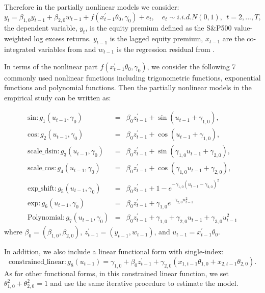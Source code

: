 \documentclass[a4paper,12pt,times,numbered,print,index]{report}
\numberwithin{equation}{section}
\begin{document}
	Therefore in the partially nonlinear models we consider: 
	$$
	y_{t} = \beta_{1,0} y_{t-1} + \beta_{2,0} w_{t-1} + f\left( x_{t-1}^{\prime }\theta _{0},\gamma _{0}\right) +e_{t}, \quad
	e_{t}\sim i.i.d.N\left( 0,1\right) ,\ \ t=2,...,T,
	$$
	the dependent variable, $y_t$, is the equity premium defined as the S\&P500 value-weighted log excess returns. $y_{t-1}$ is the lagged equity premium, $x_{t-1}$ are the co-integrated variables from \cite{zhou2018semiparametric} and $w_{t-1}$ is the regression residual from \cite{lettau2001consumption}. 
	
	In terms of the nonlinear part $f\left( x_{t-1}^{\prime }\theta _{0},\gamma _{0}\right)$, we consider the following 7 commonly used nonlinear functions including trigonometric functions, exponential functions and polynomial functions. Then the partially nonlinear models in the empirical study can be written as:
	
	\begin{eqnarray*}
		\text{sin}: g_{1}\left( u_{t-1},\gamma _{0}\right) &=& \beta _{0} z_{t-1}^{\prime} + \sin \left( u_{t-1}+\gamma_{1,0}\right),  \\
		\text{cos}: g_{2}\left( u_{t-1},\gamma _{0}\right) &=& \beta _{0} z_{t-1}^{\prime} + \cos \left( u_{t-1}+\gamma_{1,0}\right), \\
		\text{scale\_dsin}: g_{3}\left( u_{t-1},\gamma_{0}\right) &=& \beta _{0} z_{t-1}^{\prime} + \sin \left( \gamma_{1,0}u_{t-1}+\gamma_{2,0}\right),  \\
		\text{scale\_cos}: g_{4}\left( u_{t-1},\gamma_{0}\right) &=& \beta _{0} z_{t-1}^{\prime} + \cos \left( \gamma_{1,0}u_{t-1}+\gamma_{2,0}\right), \\
		\text{exp\_shift}: g_{5}\left( u_{t-1}, \gamma_{0}\right) &=&  \beta _{0} z_{t-1}^{\prime} + 1-e^{-\gamma_{1,0}\left(u_{t-1}-\gamma_{2,0}\right)^{2}} \\
		\text{exp}: g_{6}\left( u_{t-1},\gamma _{0}\right) &=&  \beta _{0} z_{t-1}^{\prime} + \gamma_{1,0} e^{-\gamma_{2,0}u_{t-1}^2}  \\
		\text{Polynomial}: g_{7}\left( u_{t-1},\gamma_{0}\right) &=& \beta _{0} z_{t-1}^{\prime} + \gamma_{1,0}+ \gamma_{2,0}u_{t-1}+\gamma_{3,0}u_{t-1}^{2}
	\end{eqnarray*}%
	where $\beta_{0} = (\beta_{1,0}, \beta_{2,0})$, $ z_{t-1}^{\prime } = (y_{t-1}, w_{t-1})$, and $u_{t-1} =  x_{t-1}^{\prime }\theta _{0}$.
	
	
	In addition, we also include a linear functional form with single-index:
	$$
	\text{constrained\_linear}: g_8\left( u_{t-1}\right) = \gamma_{1,0} +\beta _{0} z_{t-1}^{\prime} + \gamma_{2,0}(x_{1,t-1}\theta _{1,0} + x_{2,t-1}\theta _{2,0}).
	$$
	As for other functional forms, in this constrained linear function, we set $\theta^2_{1,0}+\theta_{2,0}^2 = 1$ and use the same iterative procedure to estimate the model. 
	
\end{document}
